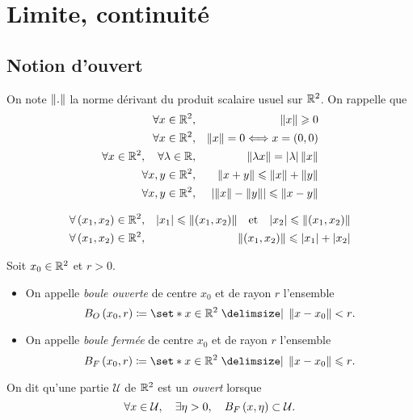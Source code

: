 \documentclass{magnolia}
\begin{document}
\magtoc

\section{Limite, continuité}



\subsection{Notion d'ouvert}

\begin{proposition}
On note $\left\|.\right\|$ la norme dérivant du produit scalaire usuel sur $\mathbb{R}^2$.
On rappelle que
\begin{eqnarray*}
\forall x\in\mathbb{R}^2, & & \left\|x\right\|\geqslant 0\\
\forall x\in\mathbb{R}^2, & & \left\|x\right\|=0 \Longleftrightarrow x=\left(0,0\right)\\
\forall x\in\mathbb{R}^2 ,\quad \forall \lambda\in\mathbb{R}, & &
        \left\|\lambda x\right\|=\left|\lambda\right|\left\|x\right\|\\
\forall x,y\in\mathbb{R}^2, & & \left\|x+y\right\|\leqslant\left\|x\right\|+\left\|y\right\|\\
\forall x,y\in\mathbb{R}^2, & & \left|\left\|x\right\|-\left\|y\right\|\right|\leqslant\left\|x-y\right\|
\end{eqnarray*}
\end{proposition}

\begin{proposition}
\begin{eqnarray*}
\forall \left(x_1,x_2\right)\in\mathbb{R}^2, & & \left|x_1\right|\leqslant\left\|\left(x_1,x_2\right)\right\| \quad\!\text{et}\quad\! 
       \left|x_2\right|\leqslant\left\|\left(x_1,x_2\right)\right\|\\
\forall \left(x_1,x_2\right)\in\mathbb{R}^2, & & \left\|\left(x_1,x_2\right)\right\|\leqslant\left|x_1\right|+\left|x_2\right|
\end{eqnarray*}
\end{proposition}

\begin{definition}
Soit $x_0\in\mathbb{R}^2$ et $r>0$.
\begin{itemize}
\item On appelle \emph{boule ouverte} de centre $x_0$ et de rayon $r$ l'ensemble
  \[B_O\p{x_0,r}\defeq\enstq{x\in\R^2}{\norme{x-x_0}<r}.\]
\item On appelle \emph{boule fermée} de centre $x_0$ et de rayon $r$ l'ensemble
  \[B_F\p{x_0,r}\defeq\enstq{x\in\R^2}{\norme{x-x_0}\leq r}.\]
\end{itemize}
\end{definition}

\begin{definition}
On dit qu'une partie $\mathcal{U}$ de $\mathbb{R}^2$ est un \emph{ouvert} lorsque
\[\forall x\in\mathcal{U} ,\quad \exists \eta>0 ,\quad
  B_F\left(x,\eta\right) \subset \mathcal{U}.\]
\end{definition}
\end{document}
